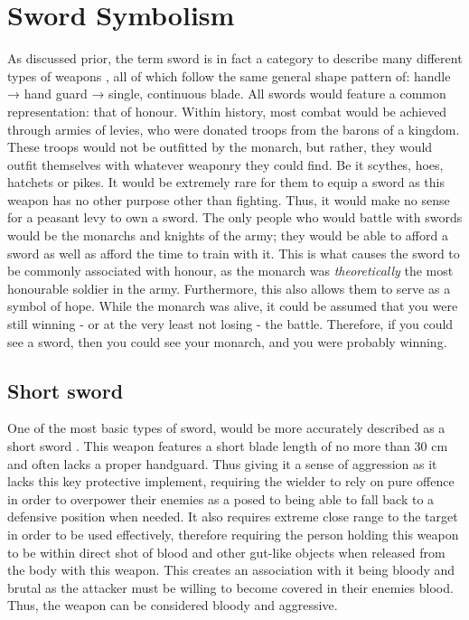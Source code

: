 \documentclass{article}
\begin{document}
\pagebreak

\section{Sword Symbolism} \label{swordSymbol}
As discussed prior, the term sword is in fact a category to describe many different types of weapons \parencite{furat1998brief}, all of which follow the same general shape pattern of: handle → hand guard → single, continuous blade.
All swords would feature a common representation: that of honour. Within history, most combat would be achieved through armies of levies, who were donated troops from the barons of a kingdom. These troops would not be outfitted by the monarch, but rather, they would outfit themselves with whatever weaponry they could find. Be it scythes, hoes, hatchets or pikes. It would be extremely rare for them to equip a sword as this weapon has no other purpose other than fighting. Thus, it would make no sense for a peasant levy to own a sword. The only people who would battle with swords would be the monarchs and knights of the army; they would be able to afford a sword as well as afford the time to train with it. This is what causes the sword to be commonly associated with honour, as the monarch was \textit{theoretically} the most honourable soldier in the army. Furthermore, this also allows them to serve as a symbol of hope. While the monarch was alive, it could be assumed that you were still winning - or at the very least not losing - the battle. Therefore, if you could see a sword, then you could see your monarch, and you were probably winning.

\subsection{Short sword} \label{shortSwordSymbol}
One of the most basic types of sword, would be more accurately described as a short sword \parencite{mcnab2010swords}. This weapon features a short blade length of no more than 30 cm and often lacks a proper handguard. Thus giving it a sense of aggression as it lacks this key protective implement, requiring the wielder to rely on pure offence in order to overpower their enemies as a posed to being able to fall back to a defensive position when needed. It also requires extreme close range to the target in order to be used effectively, therefore requiring the person holding this weapon to be within direct shot of blood and other gut-like objects when released from the body with this weapon. This creates an association with it being bloody and brutal as the attacker must be willing to become covered in their enemies blood. Thus, the weapon can be considered bloody and aggressive.
\end{document}
